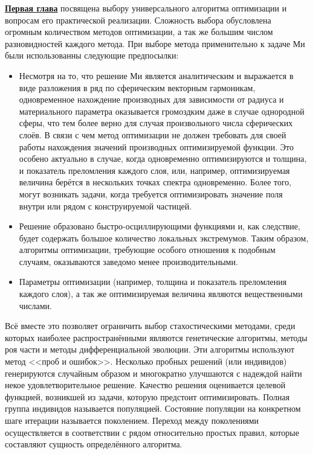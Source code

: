 \underline{\textbf{Первая глава}} посвящена выбору универсального
алгоритма оптимизации и вопросам его практической
реализации. Сложность выбора обусловлена огромным количеством методов
оптимизации, а так же большим числом разновидностей каждого
метода. При выборе метода применительно к задаче Ми были использованны
следующие предпосылки:
\begin{itemize}
\item Несмотря на то, что решение Ми является аналитическим и
  выражается в виде разложения в ряд по сферическим векторным
  гармоникам, одновременное нахождение производных для зависимости от
  радиуса и материального параметра оказывается громоздким даже в
  случае однородной сферы, что тем более верно для случая
  произвольного числа сферических слоёв.  В связи с чем метод
  оптимизации не должен требовать для своей работы нахождения значений
  производных оптимизируемой функции.  Это особено актуально в случае,
  когда одновременно оптимизируются и толщина, и показатель
  преломления каждого слоя, или, например, оптимизируемая величина
  берётся в нескольких точках спектра одновременно.  Более того, могут
  возникать задачи, когда требуется оптимизировать значение поля внутри
  или рядом с конструируемой частицей.
\item Решение образовано быстро-осциллирующими функциями и, как
  следствие, будет содержать большое количество локальных
  экстремумов. Таким образом, алгоритмы оптимизации, требующие особого
  отношения к подобным случаям, оказываются заведомо менее
  производительными.
\item Параметры оптимизации (например, толщина и показатель
  преломления каждого слоя), а так же оптимизируемая величина являются
  вещественными числами.
\end{itemize}

Всё вместе это позволяет ограничить выбор стахостическими методами,
среди которых наиболее распространёнными являются генетические
алгоритмы, методы роя части и методы дифференциальной эволюции.  Эти
алгоритмы используют метод <<проб и ошибок>>. Несколько пробных
решений (или индивидов) генерируются случайным образом и многократно
улучшаются с надеждой найти некое удовлетворительное решение. Качество
решения оценивается целевой функцией, возникшей из задачи, которую
предстоит оптимизировать. Полная группа индивидов называется
популяцией. Состояние популяции на конкретном шаге итерации называется
поколением. Переход между поколениями осуществляется в соответствии с
рядом относительно простых правил, которые составляют сущность
определённого алгоритма.

